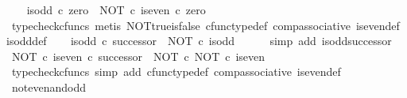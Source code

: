 \begin{isabellebody}
\ \ \isamarkupfalse%
\ {\isachardoublequoteopen}is{\isacharunderscore}{\kern0pt}odd\ {\isasymcirc}\isactrlsub c\ zero\ {\isacharequal}{\kern0pt}\ {\isacharparenleft}{\kern0pt}NOT\ {\isasymcirc}\isactrlsub c\ is{\isacharunderscore}{\kern0pt}even{\isacharparenright}{\kern0pt}\ {\isasymcirc}\isactrlsub c\ zero{\isachardoublequoteclose}\isanewline
\ \ \ \ \isamarkupfalse%
\ {\isacharparenleft}{\kern0pt}typecheck{\isacharunderscore}{\kern0pt}cfuncs{\isacharcomma}{\kern0pt}\ metis\ NOT{\isacharunderscore}{\kern0pt}true{\isacharunderscore}{\kern0pt}is{\isacharunderscore}{\kern0pt}false\ cfunc{\isacharunderscore}{\kern0pt}type{\isacharunderscore}{\kern0pt}def\ comp{\isacharunderscore}{\kern0pt}associative\ is{\isacharunderscore}{\kern0pt}even{\isacharunderscore}{\kern0pt}def{}\ is{\isacharunderscore}{\kern0pt}odd{\isacharunderscore}{\kern0pt}def{}{\isacharparenright}{\kern0pt}\isanewline
\isanewline
\ \ \isamarkupfalse%
\ {\isachardoublequoteopen}is{\isacharunderscore}{\kern0pt}odd\ {\isasymcirc}\isactrlsub c\ successor\ {\isacharequal}{\kern0pt}\ NOT\ {\isasymcirc}\isactrlsub c\ is{\isacharunderscore}{\kern0pt}odd{\isachardoublequoteclose}\isanewline
\ \ \ \ \isamarkupfalse%
\ {\isacharparenleft}{\kern0pt}simp\ add{\isacharcolon}{\kern0pt}\ is{\isacharunderscore}{\kern0pt}odd{\isacharunderscore}{\kern0pt}successor{\isacharparenright}{\kern0pt}\isanewline
\isanewline
\ \ \isamarkupfalse%
\ {\isachardoublequoteopen}{\isacharparenleft}{\kern0pt}NOT\ {\isasymcirc}\isactrlsub c\ is{\isacharunderscore}{\kern0pt}even{\isacharparenright}{\kern0pt}\ {\isasymcirc}\isactrlsub c\ successor\ {\isacharequal}{\kern0pt}\ NOT\ {\isasymcirc}\isactrlsub c\ NOT\ {\isasymcirc}\isactrlsub c\ is{\isacharunderscore}{\kern0pt}even{\isachardoublequoteclose}\isanewline
\ \ \ \ \isamarkupfalse%
\ {\isacharparenleft}{\kern0pt}typecheck{\isacharunderscore}{\kern0pt}cfuncs{\isacharcomma}{\kern0pt}\ simp\ add{\isacharcolon}{\kern0pt}\ cfunc{\isacharunderscore}{\kern0pt}type{\isacharunderscore}{\kern0pt}def\ comp{\isacharunderscore}{\kern0pt}associative\ is{\isacharunderscore}{\kern0pt}even{\isacharunderscore}{\kern0pt}def{}{\isacharparenright}{\kern0pt}\isanewline
{}\isamarkupfalse%
%
\endisatagproof
{\isafoldproof}%
%
\isadelimproof
\isanewline
%
\endisadelimproof
\isanewline
{}\isamarkupfalse%
\ not{\isacharunderscore}{\kern0pt}even{\isacharunderscore}{\kern0pt}and{\isacharunderscore}{\kern0pt}odd{\isacharcolon}{\kern0pt}\isanewline

\end{isabellebody}

